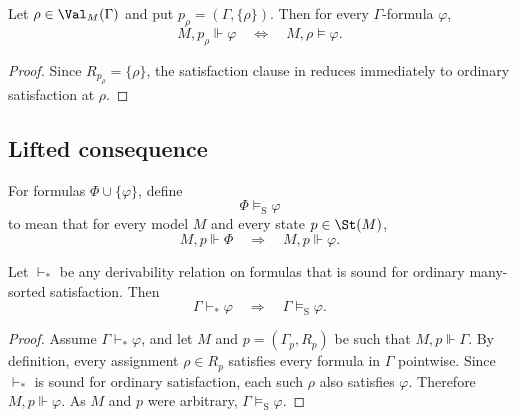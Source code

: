 \begin{proposition}\label{prop:singleton-conservativity}
Let $\rho\in\Val_M(\Gamma)$ and put $p_\rho=(\Gamma,\{\rho\})$. Then for every $\Gamma$-formula $\varphi$,
\[
M,p_\rho\Vdash\varphi
\quad\Longleftrightarrow\quad
M,\rho\models\varphi.
\]
\end{proposition}

\begin{proof}
Since $R_{p_\rho}=\{\rho\}$, the satisfaction clause in  reduces immediately to ordinary satisfaction at $\rho$.
\end{proof}

\subsection{Lifted consequence}

\begin{definition}\label{def:state-semantic-consequence}
For formulas $\Phi\cup\{\varphi\}$, define
\[
\Phi\models_{\mathrm{S}}\varphi
\]
to mean that for every model $M$ and every state $p\in\St(M)$,
\[
M,p\Vdash\Phi
\quad\Longrightarrow\quad
M,p\Vdash\varphi.
\]
\end{definition}

\begin{proposition}\label{prop:lifted-pointwise-soundness}
Let $\vdash_*$ be any derivability relation on formulas that is sound for ordinary many-sorted satisfaction. Then
\[
\Gamma\vdash_*\varphi
\quad\Longrightarrow\quad
\Gamma\models_{\mathrm{S}}\varphi.
\]
\end{proposition}

\begin{proof}
Assume $\Gamma\vdash_*\varphi$, and let $M$ and $p=(\Gamma_p,R_p)$ be such that $M,p\Vdash\Gamma$. By definition, every assignment $\rho\in R_p$ satisfies every formula in $\Gamma$ pointwise. Since $\vdash_*$ is sound for ordinary satisfaction, each such $\rho$ also satisfies $\varphi$. Therefore $M,p\Vdash\varphi$. As $M$ and $p$ were arbitrary, $\Gamma\models_{\mathrm{S}}\varphi$.
\end{proof}
